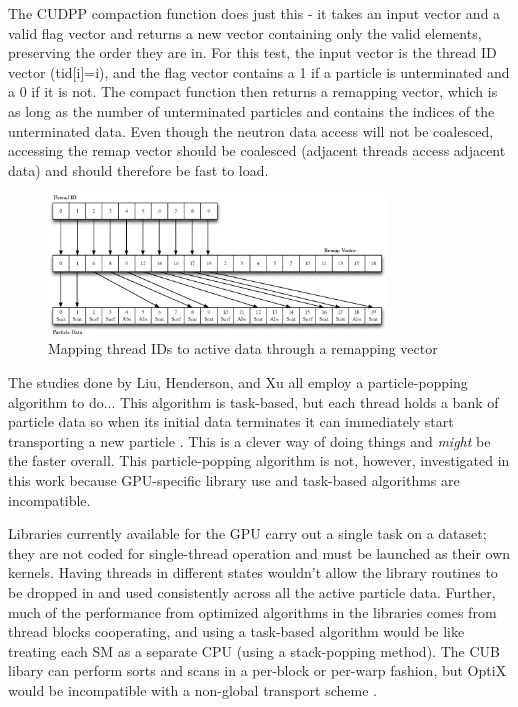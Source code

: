 The CUDPP compaction function does just this - it takes an input vector and a valid flag vector and returns a new vector containing only the valid elements, preserving the order they are in.  For this test, the input vector is the thread ID vector (tid[i]=i), and the flag vector contains a 1 if a particle is unterminated and a 0 if it is not.  The compact function then returns a remapping vector, which is as long as the number of unterminated particles and contains the indices of the unterminated data.  Even though the neutron data access will not be coalesced, accessing the remap vector should be coalesced (adjacent threads access adjacent data) and should therefore be fast to load.

\begin{figure}[h!] 
  \centering
    \includegraphics[width=0.8\textwidth]{graphics/remapping_horiz.eps}
     \caption{Mapping thread IDs to active data through a remapping vector \label{remapping} }
\end{figure}

The studies done by Liu, Henderson, and Xu all employ a particle-popping algorithm to do...  %
This algorithm is task-based, but each thread holds a bank of particle data so when its initial data terminates it can immediately start transporting a new particle \cite{tianyu, henderson, qixu}.  This is a clever way of doing things and \emph{might} be the faster overall. This particle-popping algorithm is not, however, investigated in this work because GPU-specific library use and task-based algorithms are incompatible. 

Libraries currently available for the GPU carry out a single task on a dataset; they are not coded for single-thread operation and must be launched as their own kernels.  Having threads in different states wouldn't allow the library routines to be dropped in and used consistently across all the active particle data.  Further, much of the performance from optimized algorithms in the libraries comes from thread blocks cooperating, and using a task-based algorithm would be like treating each SM as a separate CPU (using a stack-popping method).  The CUB libary can perform sorts and scans in a per-block or per-warp fashion, but OptiX would be incompatible with a non-global transport scheme \cite{optix}.

